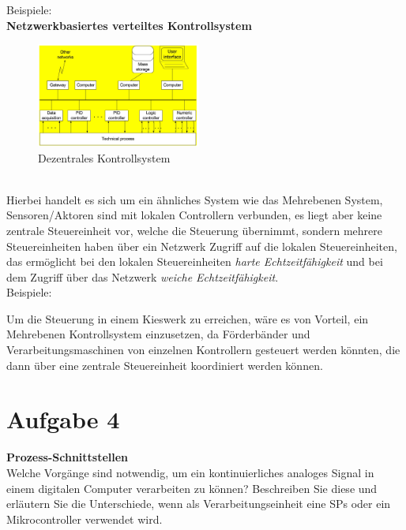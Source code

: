 \documentclass[12pt,a4paper,ngerman]{article}
\begin{document}
Beispiele: 
\pagebreak
\\
\textbf{Netzwerkbasiertes verteiltes Kontrollsystem}
\begin{figure}[h!]
  \begin{center}
    \includegraphics[width=0.48\textwidth]{figures/netzwerk.pdf}
  \end{center}
  \caption{Dezentrales Kontrollsystem}
\vspace{-10pt}
\end{figure}
\vspace{0.5cm}\\
Hierbei handelt es sich um ein ähnliches System wie das Mehrebenen System, Sensoren/Aktoren sind mit lokalen Controllern verbunden, es liegt aber keine zentrale Steuereinheit vor, welche die Steuerung übernimmt, sondern mehrere Steuereinheiten haben über ein Netzwerk Zugriff auf die lokalen Steuereinheiten, das ermöglicht bei den lokalen Steuereinheiten \textit{harte Echtzeitfähigkeit} und bei dem Zugriff über das Netzwerk \textit{weiche Echtzeitfähigkeit}.
\\
Beispiele: 

\vspace{1cm}
Um die Steuerung in einem Kieswerk zu erreichen, wäre es von Vorteil, ein Mehrebenen Kontrollsystem einzusetzen, da Förderbänder und Verarbeitungsmaschinen von einzelnen Kontrollern gesteuert werden könnten, die dann über eine zentrale Steuereinheit koordiniert werden können. 
\pagebreak


\section{Aufgabe 4}
\begin{framed}
\textbf{Prozess-Schnittstellen} \\
Welche Vorgänge sind notwendig, um ein kontinuierliches analoges Signal in einem digitalen Computer verarbeiten zu können?
Beschreiben Sie diese und erläutern Sie die Unterschiede, wenn als Verarbeitungseinheit eine SPs oder ein Mikrocontroller verwendet wird. 
\end{framed}
\pagebreak
\end{document}
